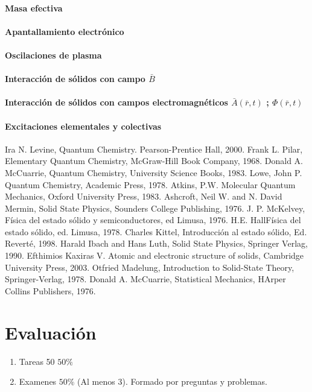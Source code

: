\documentclass[]{article}
\begin{document}
\subsection{Masa efectiva}
\subsection{Apantallamiento electrónico}
\subsection{Oscilaciones de plasma}
\subsection{Interacción de sólidos con campo $\bar{B}$}
\subsection{Interacción de sólidos con campos electromagnéticos $\bar{A}(\bar{r},t)$ ; $\Phi(\bar{r},t)$ }
\subsection{Excitaciones elementales y colectivas}

\newpage

\begin{thebibliography}{}
 Ira N. Levine, Quantum Chemistry. Pearson-Prentice Hall, 2000.
 Frank L. Pilar, Elementary Quantum Chemistry, McGraw-Hill Book Company, 1968.
 Donald A. McCuarrie, Quantum Chemistry, University Science Books, 1983.
 Lowe, John P. Quantum Chemistry, Academic Press, 1978.
 Atkins, P.W. Molecular Quantum Mechanics, Oxford University Press, 1983.
 Ashcroft, Neil W. and N. David Mermin, Solid State Physics, Sounders College Publishing, 1976.
 J. P. McKelvey, Física del estado sólido y semiconductores, ed Limusa, 1976.
 H.E. HallFísica del estado sólido, ed. Limusa, 1978.
 Charles Kittel, Introducción al estado sólido, Ed. Reverté, 1998.
 Harald Ibach and Hans Luth, Solid State Physics, Springer Verlag, 1990.
 Efthimios Kaxiras V. Atomic and electronic structure of solids, Cambridge University Press, 2003.
 Otfried Madelung, Introduction to Solid-State Theory, Springer-Verlag, 1978.
   Donald A. McCuarrie, Statistical Mechanics, HArper Collins Publishers, 1976.
\end{thebibliography}

\part*{Evaluación}
\begin{enumerate}
\item Tareas 50 $50\%$
\item Examenes $50\%$  (Al menos 3). Formado por preguntas y problemas.
\end{enumerate}
\end{document}
